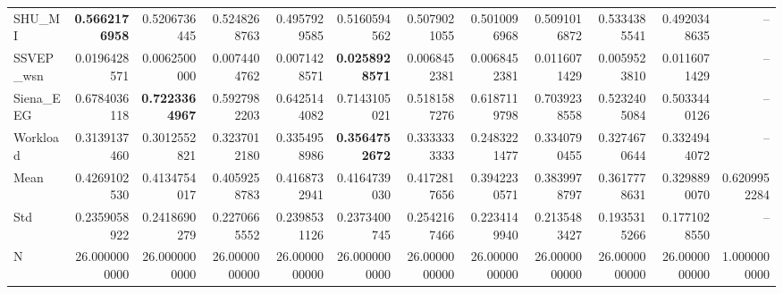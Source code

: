 \begin{table}[htbp]
\begin{tabular}{lrrrrrrrrrrr}
SHU_MI & \bfseries 0.5662176958 & 0.5206736445 & 0.5248268763 & 0.4957929585 & 0.5160594562 & 0.5079021055 & 0.5010096968 & 0.5091016872 & 0.5334385541 & 0.4920348635 & -- \\
SSVEP_wsn & 0.0196428571 & 0.0062500000 & 0.0074404762 & 0.0071428571 & \bfseries 0.0258928571 & 0.0068452381 & 0.0068452381 & 0.0116071429 & 0.0059523810 & 0.0116071429 & -- \\
Siena_EEG & 0.6784036118 & \bfseries 0.7223364967 & 0.5927982203 & 0.6425144082 & 0.7143105021 & 0.5181587276 & 0.6187119798 & 0.7039238558 & 0.5232405084 & 0.5033440126 & -- \\
Workload & 0.3139137460 & 0.3012552821 & 0.3237012180 & 0.3354958986 & \bfseries 0.3564752672 & 0.3333333333 & 0.2483221477 & 0.3340790455 & 0.3274670644 & 0.3324944072 & -- \\
Mean & 0.4269102530 & 0.4134754017 & 0.4059258783 & 0.4168732941 & 0.4164739030 & 0.4172817656 & 0.3942230571 & 0.3839978797 & 0.3617778631 & 0.3298890070 & 0.6209952284 \\
Std & 0.2359058922 & 0.2418690279 & 0.2270665552 & 0.2398531126 & 0.2373400745 & 0.2542167466 & 0.2234149940 & 0.2135483427 & 0.1935315266 & 0.1771028550 & -- \\
N & 26.0000000000 & 26.0000000000 & 26.0000000000 & 26.0000000000 & 26.0000000000 & 26.0000000000 & 26.0000000000 & 26.0000000000 & 26.0000000000 & 26.0000000000 & 1.0000000000 \\
\bottomrule
\end{tabular}
\end{table}
